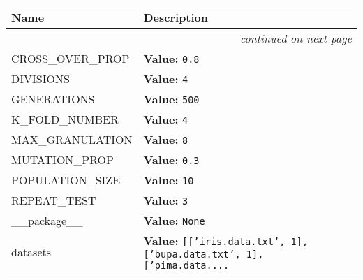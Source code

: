     \vspace{-1cm}
\hspace{\varindent}\begin{longtable}{|p{\varnamewidth}|p{\vardescrwidth}|l}
\cline{1-2}
\cline{1-2} \centering \textbf{Name} & \centering \textbf{Description}& \\
\cline{1-2}
\endhead\cline{1-2}\multicolumn{3}{r}{\small\textit{continued on next page}}\\\endfoot\cline{1-2}
\endlastfoot\raggedright C\-R\-O\-S\-S\-\_\-O\-V\-E\-R\-\_\-P\-R\-O\-P\- & \raggedright \textbf{Value:} 
{\tt 0.8}&\\
\cline{1-2}
\raggedright D\-I\-V\-I\-S\-I\-O\-N\-S\- & \raggedright \textbf{Value:} 
{\tt 4}&\\
\cline{1-2}
\raggedright G\-E\-N\-E\-R\-A\-T\-I\-O\-N\-S\- & \raggedright \textbf{Value:} 
{\tt 500}&\\
\cline{1-2}
\raggedright K\-\_\-F\-O\-L\-D\-\_\-N\-U\-M\-B\-E\-R\- & \raggedright \textbf{Value:} 
{\tt 4}&\\
\cline{1-2}
\raggedright M\-A\-X\-\_\-G\-R\-A\-N\-U\-L\-A\-T\-I\-O\-N\- & \raggedright \textbf{Value:} 
{\tt 8}&\\
\cline{1-2}
\raggedright M\-U\-T\-A\-T\-I\-O\-N\-\_\-P\-R\-O\-P\- & \raggedright \textbf{Value:} 
{\tt 0.3}&\\
\cline{1-2}
\raggedright P\-O\-P\-U\-L\-A\-T\-I\-O\-N\-\_\-S\-I\-Z\-E\- & \raggedright \textbf{Value:} 
{\tt 10}&\\
\cline{1-2}
\raggedright R\-E\-P\-E\-A\-T\-\_\-T\-E\-S\-T\- & \raggedright \textbf{Value:} 
{\tt 3}&\\
\cline{1-2}
\raggedright \_\-\_\-p\-a\-c\-k\-a\-g\-e\-\_\-\_\- & \raggedright \textbf{Value:} 
{\tt None}&\\
\cline{1-2}
\raggedright d\-a\-t\-a\-s\-e\-t\-s\- & \raggedright \textbf{Value:} 
{\tt \texttt{[}\texttt{[}\texttt{'}\texttt{iris.data.txt}\texttt{'}\texttt{, }1\texttt{]}\texttt{, }\texttt{[}\texttt{'}\texttt{bupa.data.txt}\texttt{'}\texttt{, }1\texttt{]}\texttt{, }\texttt{[}\texttt{'}\texttt{pima.data.}\texttt{...}}&\\
\cline{1-2}
\end{longtable}



